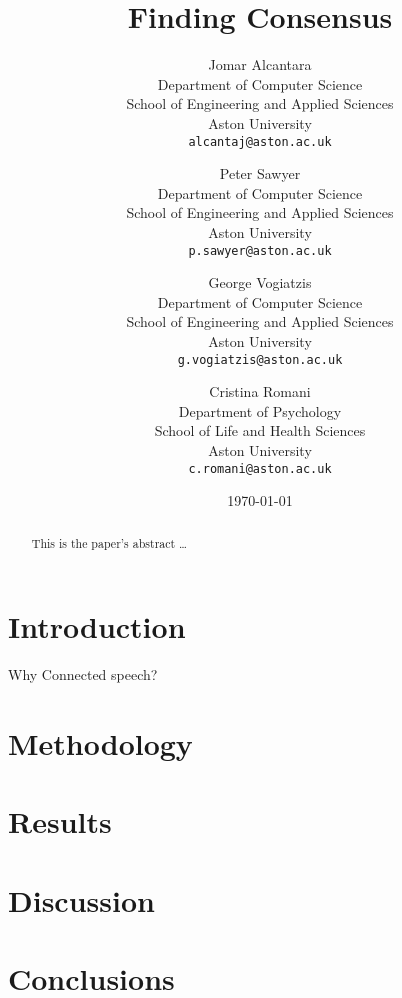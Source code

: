 \documentclass[12pt]{article}
\title{Finding Consensus}
\author{
	Jomar Alcantara \\
	Department of Computer Science\\
	School of Engineering and Applied Sciences\\
	Aston University\\
	\texttt{alcantaj@aston.ac.uk} \\
		\and
	Peter Sawyer \\
	Department of Computer Science\\
	School of Engineering and Applied Sciences\\
	Aston University\\
	\texttt{p.sawyer@aston.ac.uk}
		\and
	George Vogiatzis\\
	Department of Computer Science\\
	School of Engineering and Applied Sciences\\
	Aston University \\
	\texttt{g.vogiatzis@aston.ac.uk} \\
		\and
	Cristina Romani\\
	Department of Psychology\\
	School of Life and Health Sciences\\
	Aston University \\
	\texttt{c.romani@aston.ac.uk}
}
\date{\today}
\begin{document}
\maketitle

\bigskip
\begin{abstract}
This is the paper's abstract \ldots
\end{abstract}

\section{Introduction}\label{introduction}


Why Connected speech?
\section{Methodology}\label{methodology}

\section{Results}\label{results}

\section{Discussion}\label{discussion}

\section{Conclusions}\label{conclusions}




%
%
\end{document}

